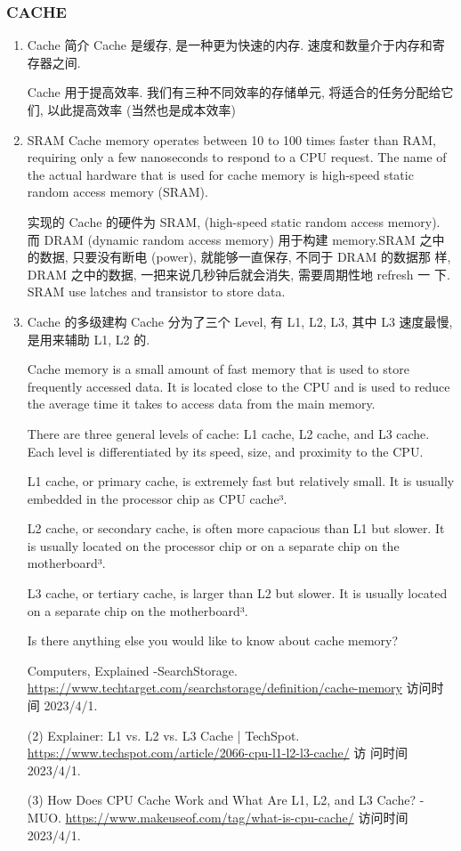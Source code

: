 \documentclass[11pt]{ctexart}
\begin{document}
\subsubsection{CACHE}
\label{sec:orge78d798}
\begin{enumerate}
\item Cache 简介
\label{sec:org1b9ff4c}
Cache 是缓存, 是一种更为快速的内存. 速度和数量介于内存和寄存器之间. 

Cache 用于提高效率. 我们有三种不同效率的存储单元, 将适合的任务分配给它
们, 以此提高效率 (当然也是成本效率)
\item SRAM
\label{sec:orgc836fc4}
Cache memory operates between 10 to 100 times faster than RAM,
requiring only a few nanoseconds to respond to a CPU request. The name
of the actual hardware that is used for cache memory is high-speed
static random access memory (SRAM).

实现的 Cache 的硬件为 SRAM, (high-speed static random access
memory). 而 DRAM (dynamic random access memory) 用于构建 memory.SRAM
之中的数据, 只要没有断电 (power), 就能够一直保存, 不同于 DRAM 的数据那
样, DRAM 之中的数据, 一把来说几秒钟后就会消失, 需要周期性地 refresh 一
下. SRAM use latches and transistor to store data.  
\item Cache 的多级建构
\label{sec:orgf099a95}
Cache 分为了三个 Level, 有 L1, L2, L3, 其中 L3 速度最慢, 是用来辅助
L1, L2 的.

Cache memory is a small amount of fast memory that is used to store
frequently accessed data. It is located close to the CPU and is used
to reduce the average time it takes to access data from the main
memory. 

There are three general levels of cache: L1 cache, L2 cache, and L3
cache. Each level is differentiated by its speed, size, and proximity
to the CPU. 

L1 cache, or primary cache, is extremely fast but relatively small. It
is usually embedded in the processor chip as CPU cache³. 

L2 cache, or secondary cache, is often more capacious than L1 but
slower. It is usually located on the processor chip or on a separate
chip on the motherboard³. 

L3 cache, or tertiary cache, is larger than L2 but slower. It is
usually located on a separate chip on the motherboard³. 

Is there anything else you would like to know about cache memory?

Computers, Explained -SearchStorage. \url{https://www.techtarget.com/searchstorage/definition/cache-memory}
访问时间 2023/4/1.

(2) Explainer: L1 vs. L2 vs. L3 Cache |
TechSpot. \url{https://www.techspot.com/article/2066-cpu-l1-l2-l3-cache/} 访
问时间 2023/4/1.

(3) How Does CPU Cache Work and What Are L1, L2, and L3 Cache? -
MUO. \url{https://www.makeuseof.com/tag/what-is-cpu-cache/} 访问时间
2023/4/1.
\end{enumerate}
\end{document}
